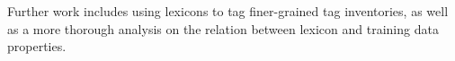 \documentclass[11pt,letterpaper]{article}
\begin{document}



Further work includes using lexicons to tag finer-grained tag inventories, as well as a more thorough analysis on the
relation between lexicon and training data properties.






\end{document}

